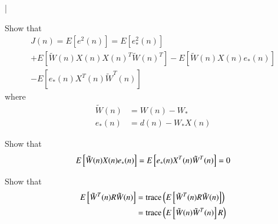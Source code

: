 |\documentclass[journal,12pt,twocolumn]{IEEEtran}
\begin{document}
\begin{problem}
Show that 
\begin{multline}
J(n)=E[e^{2}(n)]
=E[e_{*}^{2}(n)]
\\
 + E[\tilde W(n)X(n) X(n)^{T} \tilde W(n)^T] 
- E[ \tilde W(n)X(n)e_{*}(n)] 
\\ 
- E[ e_{*}(n)X^{T}(n)\tilde W^T(n)]
\end{multline}
%
 where  
 \begin{align}
 \label{eq:w_tilde}
 \tilde W(n)&= W(n) - W_{*}\\
 e_{*}(n)&= d(n) - W_{*}X(n)
 \label{eq:e_star}
 \end{align}
\end{problem}
\begin{problem}
Show that
\begin{equation}
E{}\left[ \tilde W(n)X(n)e_{*}(n)\right] = E{}\left[ e_{*}(n)X^{T}(n)\tilde W^T(n)\right] = 0
\end{equation}
\end{problem}
%
\begin{problem}
Show that
\begin{align}
E{}\left[\tilde W^{T}(n) R \tilde W(n)\right] &= \text{trace}\left(E{}\left[\tilde W^{T}(n) R \tilde W(n)\right]\right)
\\
&= \text{trace}\left(E{}\left[\tilde W(n)\tilde W^{T}(n) \right]R\right)
\end{align}

\end{problem}
\end{document}
